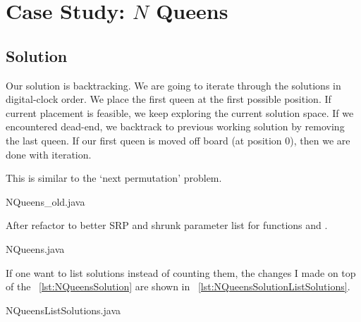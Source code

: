 
\chapter{Case Study: $N$ Queens}\label{ch:n-queens}





\section{Solution}
Our solution is backtracking.
We are going to iterate through the solutions in digital-clock order.
We place the first queen at the first possible position.
If current placement is feasible, we keep exploring the current solution space.
If we encountered dead-end, we backtrack to previous working solution by removing the last queen.
If our first queen is moved off board (at position 0), then we are done with iteration.

This is similar to the `next permutation' problem.



{NQueens_old.java}

After refactor to better SRP and shrunk parameter list for functions  and
.


{NQueens.java}

If one want to list solutions instead of counting them, the changes I made on top of the
~\autoref{lst:NQueensSolution} are shown in ~\autoref{lst:NQueensSolutionListSolutions}.


{NQueensListSolutions.java}
